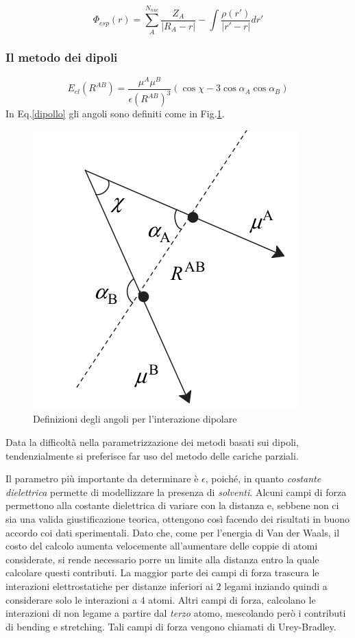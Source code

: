 \documentclass[oneside]{amsbook}
\numberwithin{section}{chapter}
\numberwithin{equation}{section}
\numberwithin{figure}{section}
\begin{document}
\begin{equation}
\label{esp}
\Phi_{esp}(r)= \sum \limits_{A}^{N_{nuc}} \frac{Z_A}{\vert R_A-r \vert}-\int \frac{\rho (r')}{\vert r'-r \vert}dr'
\end{equation}

\subsubsection{Il metodo dei dipoli}
\begin{equation}
\label{dipollo}
E_{el}(R^{AB})= \frac{\mu ^A \mu ^B}{\epsilon( R^{AB}     )^3} (\cos \chi - 3 \cos \alpha_A \cos \alpha _B   )
\end{equation}
In Eq.\ref{dipollo} gli angoli sono definiti come in Fig.\ref{diocancro}.

\begin{figure} [H]
\label{diocancro}
\centering
\caption{Definizioni degli angoli per l'interazione dipolare}
\includegraphics[scale=0.3]{dipoli}
\end{figure}
Data la difficoltà nella parametrizzazione dei metodi basati sui dipoli, tendenzialmente si preferisce far uso del metodo delle cariche parziali.

Il parametro più importante da determinare è $\epsilon$, poiché, in quanto \emph{costante dielettrica} permette di modellizzare la presenza di \emph{solventi}. Alcuni campi di forza permettono alla costante dielettrica di variare con la distanza e, sebbene non ci sia una valida giustificazione teorica, ottengono così facendo dei risultati in buono accordo coi dati sperimentali.
Dato che, come per l'energia di Van der Waals,  il costo del calcolo aumenta velocemente all'aumentare delle coppie di atomi considerate, si rende necessario porre un limite alla distanza entro la quale calcolare questi contributi. La maggior parte dei campi di forza trascura le interazioni elettrostatiche per distanze inferiori ai $2$ legami inziando quindi a considerare solo le interazioni a $4$ atomi.
Altri campi di forza, calcolano le interazioni di non legame a partire dal \emph{terzo} atomo, mescolando però i contributi di bending e stretching. Tali campi di forza vengono chiamati di Urey-Bradley.
\end{document}
